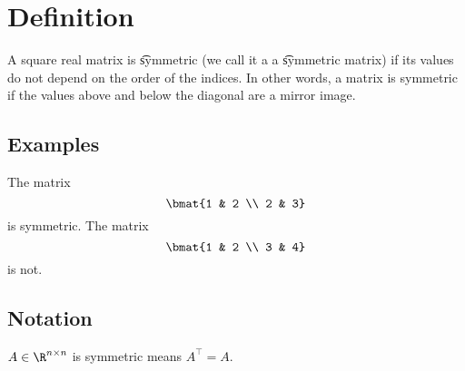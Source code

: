 
\section*{Definition}

A square real matrix is \t{symmetric} (we call it a a \t{symmetric matrix}) if its values do not depend on the order of the indices.
In other words, a matrix is symmetric if the values above and below the diagonal are a mirror image.

\subsection*{Examples}

The matrix
  \[
\bmat{1 & 2 \\ 2 & 3}
  \]
is symmetric.
The matrix
  \[
\bmat{1 & 2 \\ 3 & 4}
  \]
is not.

\subsection*{Notation}

$A \in \R ^{n \times n}$ is symmetric means $A^\top  = A$.

\blankpage